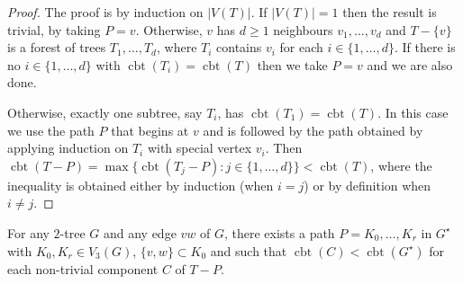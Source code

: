 \documentclass[kpfonts]{patmorin}
\DeclareMathOperator{\cbt}{cbt}
\begin{document}
\begin{proof}
    The proof is by induction on $|V(T)|$.  If $|V(T)|=1$ then the result is trivial, by taking $P=v$.  Otherwise, $v$ has $d\ge 1$ neighbours $v_1,\ldots,v_d$ and $T-\{v\}$ is a forest of trees $T_1,\ldots,T_d$, where $T_i$ contains $v_i$ for each $i\in\{1,\ldots,d\}$.  If there is no $i\in\{1,\ldots,d\}$ with $\cbt(T_i)=\cbt(T)$ then we take $P=v$ and we are also done.

    Otherwise, exactly one subtree, say $T_i$, has $\cbt(T_1)=\cbt(T)$.  In this case we use the path $P$ that begins at $v$ and is followed by the path obtained by applying induction on $T_i$ with special vertex $v_i$.  Then $\cbt(T-P) = \max\{\cbt(T_j-P): j\in\{1,\ldots,d\}\} < \cbt(T)$, where the inequality is obtained either by induction (when $i=j$) or by definition when $i\neq j$.
\end{proof}

\begin{lem}\label{serpentine_separator}
    For any $2$-tree $G$ and any edge $vw$ of $G$, there exists a path $P=K_0,\ldots,K_r$ in $G^\star$ with $K_0,K_r\in V_3(G)$, $\{v,w\}\subset K_0$ and such that $\cbt(C)<\cbt(G^{\star})$ for each non-trivial component $C$ of $T-P$.
\end{lem}
\end{document}
